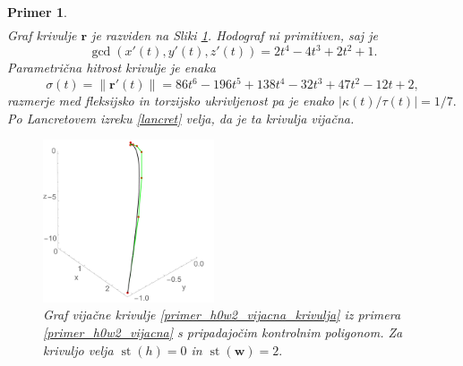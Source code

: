 \documentclass[12pt,a4paper,twoside]{article}
\theoremstyle{definition} %
\theoremstyle{plain} %
\theoremstyle{primerstyle}
\newtheorem{primer}[definicija]{Primer}
\numberwithin{equation}{section}  %
\newcommand{\rV}{\mathbf{r}}
\newcommand{\wV}{\mathbf{w}}
\DeclareMathOperator{\st}{st}
\begin{document}
\begin{primer}
\begin{align}
	\end{align}
	Graf krivulje $\rV$ je razviden na Sliki \ref{fig:h0w2_vijacna}. Hodograf ni primitiven, saj je $$\gcd(x'(t),y'(t),z'(t))=2t^4-4t^3+2t^2+1.$$ Parametrična hitrost krivulje je enaka
	\begin{equation*}
		\sigma(t)=\lVert\rV'(t)\rVert=86t^6-196t^5+138t^4-32t^3+47t^2-12t+2,
	\end{equation*}
	razmerje med fleksijsko in torzijsko ukrivljenost pa je enako $|\kappa(t)/\tau(t)|=1/7.$ Po Lancretovem izreku \ref{lancret} velja, da je ta krivulja vijačna.
	\begin{figure}[h]
	  \centering
	  \includegraphics[width=0.45\textwidth]{images/h0w2_vijacna.pdf}
	  \caption[Primer vijačne krivulje ($\st(h)=0,$ $\st(\wV)=2$)]{Graf vijačne krivulje \eqref{primer_h0w2_vijacna_krivulja} iz primera \ref{primer_h0w2_vijacna} s pripadajočim kontrolnim poligonom. Za krivuljo velja $\st(h)=0$ in $\st(\wV)=2.$}
	  \label{fig:h0w2_vijacna}
	\end{figure}
\end{primer}
\end{document}
